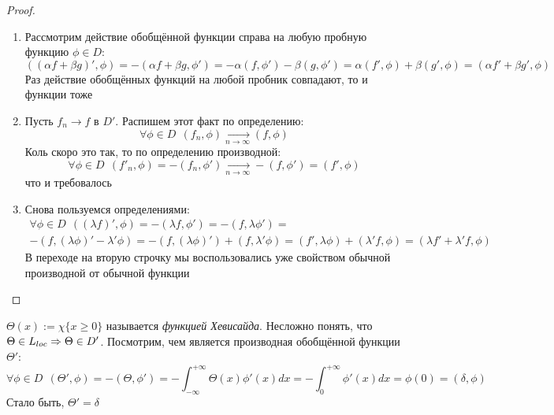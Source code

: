 \begin{proof}~
	\begin{enumerate}
		\item Рассмотрим действие обобщённой функции справа на любую пробную функцию $\phi \in D$:
		\[
			((\alpha f + \beta g)', \phi) = -(\alpha f + \beta g, \phi') = -\alpha(f, \phi') - \beta(g, \phi') = \alpha(f', \phi) + \beta(g', \phi) = (\alpha f' + \beta g', \phi)
		\]
		Раз действие обобщённых функций на любой пробник совпадают, то и функции тоже
		
		\item Пусть $f_n \to f$ в $D'$. Распишем этот факт по определению:
		\[
			\forall \phi \in D\ \ (f_n, \phi) \xrightarrow[n \to \infty]{} (f, \phi)
		\]
		Коль скоро это так, то по определению производной:
		\[
			\forall \phi \in D\ \ (f'_n, \phi) = -(f_n, \phi') \xrightarrow[n \to \infty]{} -(f, \phi') = (f', \phi)
		\]
		что и требовалось
		
		\item Снова пользуемся определениями:
		\begin{multline*}
			\forall \phi \in D\ \ ((\lambda f)', \phi) = -(\lambda f, \phi') = -(f, \lambda \phi') =
			\\
			-(f, (\lambda \phi)' - \lambda' \phi) = -(f, (\lambda \phi)') + (f, \lambda' \phi) = (f', \lambda \phi) + (\lambda' f, \phi) = (\lambda f' + \lambda' f, \phi)
		\end{multline*}
		В переходе на вторую строчку мы воспользовались уже свойством обычной производной от обычной функции
	\end{enumerate}
\end{proof}

\begin{example}
	$\Theta(x) := \chi\{x \ge 0\}$ называется \textit{функцией Хевисайда}. Несложно понять, что $\Theta \in L_{loc} \Rightarrow \Theta \in D'$. Посмотрим, чем является производная обобщённой функции $\Theta'$:
	\[
		\forall \phi \in D\ \ (\Theta', \phi) = -(\Theta, \phi') = -\int_{-\infty}^{+\infty} \Theta(x)\phi'(x)dx = -\int_0^{+\infty} \phi'(x)dx = \phi(0) = (\delta, \phi)
	\]
	Стало быть, $\Theta' = \delta$
\end{example}